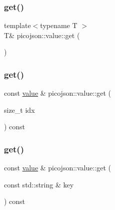 \hypertarget{classpicojson_1_1value_a94f71153b3d14df524397a5cafcef2fc}{}\label{classpicojson_1_1value_a94f71153b3d14df524397a5cafcef2fc} 
\subsubsection{\texorpdfstring{get()}{get()}\hspace{0.1cm}{\footnotesize\ttfamily [2/6]}}
{\footnotesize\ttfamily template$<$typename T $>$ \\
T\& picojson\+::value\+::get (\begin{DoxyParamCaption}{ }\end{DoxyParamCaption})}

\hypertarget{classpicojson_1_1value_a6070daccb2b8cb44e6ab62137b2f5a9d}{}\label{classpicojson_1_1value_a6070daccb2b8cb44e6ab62137b2f5a9d} 
\subsubsection{\texorpdfstring{get()}{get()}\hspace{0.1cm}{\footnotesize\ttfamily [3/6]}}
{\footnotesize\ttfamily const \hyperlink{classpicojson_1_1value}{value} \& picojson\+::value\+::get (\begin{DoxyParamCaption}\item[{size\+\_\+t}]{idx }\end{DoxyParamCaption}) const\hspace{0.3cm}{\ttfamily [inline]}}

\hypertarget{classpicojson_1_1value_aafe8fe780ae3b149bb7bd353e39d6f29}{}\label{classpicojson_1_1value_aafe8fe780ae3b149bb7bd353e39d6f29} 
\subsubsection{\texorpdfstring{get()}{get()}\hspace{0.1cm}{\footnotesize\ttfamily [4/6]}}
{\footnotesize\ttfamily const \hyperlink{classpicojson_1_1value}{value} \& picojson\+::value\+::get (\begin{DoxyParamCaption}\item[{const std\+::string \&}]{key }\end{DoxyParamCaption}) const\hspace{0.3cm}{\ttfamily [inline]}}

